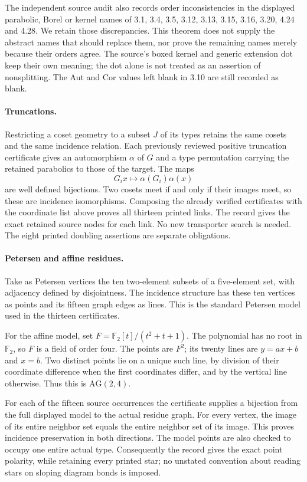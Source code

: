\documentclass[10pt]{article}
\begin{document}
The independent source audit also records order inconsistencies in
the displayed parabolic, Borel or kernel names of 3.1, 3.4, 3.5, 3.12,
3.13, 3.15, 3.16, 3.20, 4.24 and 4.28. We retain those discrepancies.
This theorem does not supply the abstract names that should replace
them, nor prove the remaining names merely because their orders agree.
The source's boxed kernel and generic extension dot keep their own
meaning; the dot alone is not treated as an assertion of nonsplitting.
The Aut and Cor values left blank in 3.10 are still recorded as blank.

\paragraph{Truncations.}
Restricting a coset geometry to a subset $J$ of its types retains the
same cosets and the same incidence relation. Each previously reviewed
positive truncation certificate gives an automorphism $\alpha$ of $G$
and a type permutation carrying the retained parabolics to those of
the target. The maps
\[
             G_i x\longmapsto \alpha(G_i)\alpha(x)
\]
are well defined bijections. Two cosets meet if and only if their
images meet, so these are incidence isomorphisms. Composing the
already verified certificates with the coordinate list above proves
all thirteen printed links. The record gives the exact retained source
nodes for each link. No new transporter search is needed. The eight
printed doubling assertions are separate obligations.

\paragraph{Petersen and affine residues.}
Take as Petersen vertices the ten two-element subsets of a five-element
set, with adjacency defined by disjointness. The incidence structure
has these ten vertices as points and its fifteen graph edges as lines.
This is the standard Petersen model used in the thirteen certificates.

For the affine model, set $F=\mathbb F_2[t]/(t^2+t+1)$. The polynomial
has no root in $\mathbb F_2$, so $F$ is a field of order four.
The points are $F^2$; its twenty lines are $y=ax+b$ and $x=b$.
Two distinct points lie on a unique such line, by division of their
coordinate difference when the first coordinates differ, and by the
vertical line otherwise. Thus this is $\mathrm{AG}(2,4)$.

For each of the fifteen source occurrences the certificate supplies a
bijection from the full displayed model to the actual residue graph.
For every vertex, the image of its entire neighbor set equals the
entire neighbor set of its image. This proves incidence preservation
in both directions. The model points are also checked to occupy one
entire actual type. Consequently the record gives the exact point
polarity, while retaining every printed star; no unstated convention
about reading stars on sloping diagram bonds is imposed.
\end{document}
